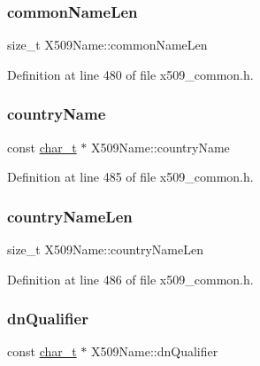 \subsubsection{\texorpdfstring{common\+Name\+Len}{commonNameLen}}
{\footnotesize\ttfamily size\+\_\+t X509\+Name\+::common\+Name\+Len}



Definition at line 480 of file x509\+\_\+common.\+h.

\mbox{\label{structX509Name_aebedcf83915608e1929d6cc612a67c2e}} 
\subsubsection{\texorpdfstring{country\+Name}{countryName}}
{\footnotesize\ttfamily const \hyperlink{compiler__port_8h_a40bb5262bf908c328fbcfbe5d29d0201}{char\+\_\+t} $\ast$ X509\+Name\+::country\+Name}



Definition at line 485 of file x509\+\_\+common.\+h.

\mbox{\label{structX509Name_ae146dda0b021633e3cfc15bda3435bf9}} 
\subsubsection{\texorpdfstring{country\+Name\+Len}{countryNameLen}}
{\footnotesize\ttfamily size\+\_\+t X509\+Name\+::country\+Name\+Len}



Definition at line 486 of file x509\+\_\+common.\+h.

\mbox{\label{structX509Name_aff2c9afbb89584912d7a66f70d2e21ea}} 
\subsubsection{\texorpdfstring{dn\+Qualifier}{dnQualifier}}
{\footnotesize\ttfamily const \hyperlink{compiler__port_8h_a40bb5262bf908c328fbcfbe5d29d0201}{char\+\_\+t} $\ast$ X509\+Name\+::dn\+Qualifier}



